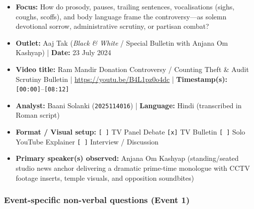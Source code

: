 \documentclass[10pt,a4paper]{article}
\begin{document}
\begin{itemize}
  \item \textbf{Focus:} How do prosody, pauses, trailing sentences, vocalisations (sighs, coughs, scoffs), and body language frame the controversy---as solemn devotional sorrow, administrative scrutiny, or partisan combat?
  \item \textbf{Outlet:} Aaj Tak (\textit{Black \& White} / Special Bulletin with Anjana Om Kashyap) | \textbf{Date:} 23 July 2024
  \item \textbf{Video title:} Ram Mandir Donation Controversy / Counting Theft \& Audit Scrutiny Bulletin | \href{https://youtu.be/B4L1pz0o4dc}{https://youtu.be/B4L1pz0o4dc} | \textbf{Timestamp(s):} \texttt{[00:00]}--\texttt{[08:12]}
  \item \textbf{Analyst:} Baani Solanki (\texttt{2025114016}) | \textbf{Language:} Hindi (transcribed in Roman script)
  \item \textbf{Format / Visual setup:} \texttt{[ ]} TV Panel Debate \texttt{[x]} TV Bulletin \texttt{[ ]} Solo YouTube Explainer \texttt{[ ]} Interview / Discussion
  \item \textbf{Primary speaker(s) observed:} Anjana Om Kashyap (standing/seated studio news anchor delivering a dramatic prime-time monologue with CCTV footage inserts, temple visuals, and opposition soundbites)
\end{itemize}

\subsubsection*{Event-specific non-verbal questions (Event 1)}
\end{document}
